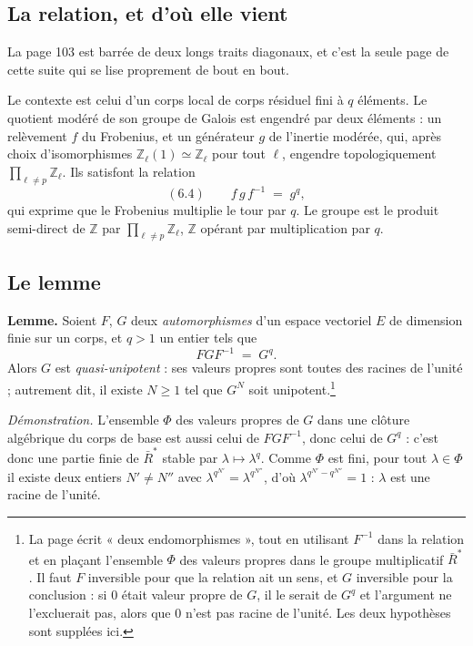\documentclass[11pt,a4paper]{article}
\begin{document}
\subsection*{La relation, et d'où elle vient}

La page 103 est barrée de deux longs traits diagonaux, et c'est la seule page de cette suite qui se lise proprement de bout en bout.

Le contexte est celui d'un corps local de corps résiduel fini à $q$ éléments.
Le quotient modéré de son groupe de Galois est engendré par deux éléments : un
relèvement $f$ du Frobenius, et un générateur $g$ de l'inertie modérée, qui,
après choix d'isomorphismes $\mathbb{Z}_{\ell}(1) \simeq \mathbb{Z}_{\ell}$
pour tout $\ell$, engendre topologiquement
$\prod_{\ell \neq p} \mathbb{Z}_{\ell}$. Ils satisfont la relation
\[
  (6.4) \qquad f\,g\,f^{-1} \;=\; g^{q} ,
\]
qui exprime que le Frobenius multiplie le tour par $q$. Le groupe est le
produit semi-direct de $\mathbb{Z}$ par $\prod_{\ell\neq p}\mathbb{Z}_{\ell}$,
$\mathbb{Z}$ opérant par multiplication par $q$.

\subsection*{Le lemme}

\textbf{Lemme.} Soient $F$, $G$ deux \emph{automorphismes} d'un espace
vectoriel $E$ de dimension finie sur un corps, et $q > 1$ un entier tels que
\[
  F G F^{-1} \;=\; G^{q} .
\]
Alors $G$ est \emph{quasi-unipotent} : ses valeurs propres sont toutes des
racines de l'unité ; autrement dit, il existe $N \geqslant 1$ tel que $G^{N}$
soit unipotent.\footnote{La page écrit « deux endomorphismes », tout en
utilisant $F^{-1}$ dans la relation et en plaçant l'ensemble $\Phi$ des valeurs
propres dans le groupe multiplicatif $\bar{R}^{*}$. Il faut $F$ inversible pour
que la relation ait un sens, et $G$ inversible pour la conclusion : si $0$
était valeur propre de $G$, il le serait de $G^{q}$ et l'argument ne
l'excluerait pas, alors que $0$ n'est pas racine de l'unité. Les deux
hypothèses sont supplées ici.}

\emph{Démonstration.} L'ensemble $\Phi$ des valeurs propres de $G$ dans une
clôture algébrique du corps de base est aussi celui de $FGF^{-1}$, donc celui
de $G^{q}$ : c'est donc une partie finie de $\bar{R}^{*}$ stable par
$\lambda \mapsto \lambda^{q}$. Comme $\Phi$ est fini, pour tout
$\lambda \in \Phi$ il existe deux entiers $N' \neq N''$ avec
$\lambda^{q^{N'}} = \lambda^{q^{N''}}$, d'où $\lambda^{q^{N'} - q^{N''}} = 1$ :
$\lambda$ est une racine de l'unité.
\end{document}
